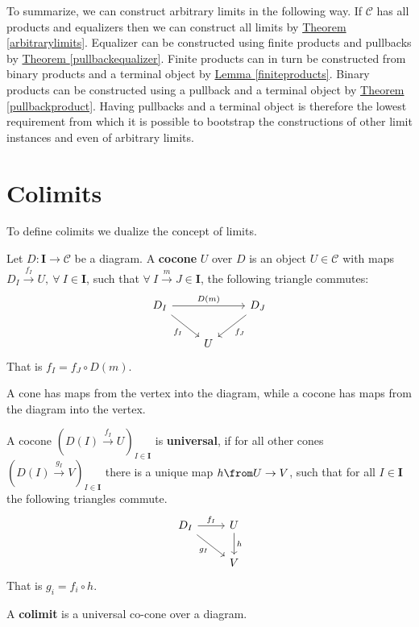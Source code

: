 To summarize, we can construct arbitrary limits in the following way.
If $\mathscr C$ has all products and equalizers then we can
construct all limits by
\hyperref[arbitrarylimits]{Theorem \ref*{arbitrarylimits}}.
Equalizer can be constructed using finite products and pullbacks
by \hyperref[arbitrarylimits]{Theorem \ref*{pullbackequalizer}}.
Finite products can in turn be constructed from binary products and a terminal object
by \hyperref[finiteproducts]{Lemma \ref*{finiteproducts}}.
Binary products can be constructed using a pullback and a terminal object
by \hyperref[arbitrarylimits]{Theorem \ref*{pullbackproduct}}.
Having pullbacks and a terminal object is therefore the lowest requirement from
which it is possible to bootstrap the constructions of other limit instances
and even of arbitrary limits.

\section{Colimits}
To define colimits we dualize the concept of limits.
\begin{definition}
  Let $D : \bm I \to \mathscr C$ be a diagram.
  A \textbf{cocone} $U$ over $D$ is an object $U \in \mathscr{C}$
  with maps $D_I \overset{ f_I}{\rightarrow} U,\ \forall\ I \in \bm{I}$, such that
  $\forall\ I \overset{m}{\to} J \in \bm{I}$, the following triangle commutes:
  \[
    \begin{tikzcd}
      D_I \arrow[rr, "D(m)"]\arrow[dr, swap, "f_I"] & & D_J \arrow{dl}{f_J}\\
      & U  &
    \end{tikzcd}
  \]
  That is $f_I = f_J \circ D(m)$.
\end{definition}
A cone has maps from the vertex into the diagram,
while a cocone has maps from the diagram into the vertex.
\begin{definition}
  A cocone $(D(I)\overset{f_I}{\to} U)_{I\in \bm{I}}$ is \textbf{universal}, if
  for all other cones $(D(I) \overset{g_I}{\to} V)_{I\in \bm{I}}$ there is a unique
  map $h \from U \to V$, such that for all $I \in \bm{I}$
  the following triangles commute.
  \[
    \begin{tikzcd}
      D_I \arrow[dr, swap, "g_I"] \arrow{r}{f_I} & U \arrow{d}{h} \\
      & V
    \end{tikzcd}
  \]
  That is $g_i = f_i \circ h$.
\end{definition}

\begin{definition}
  A \textbf{colimit} is a universal co-cone over a diagram.
\end{definition}

